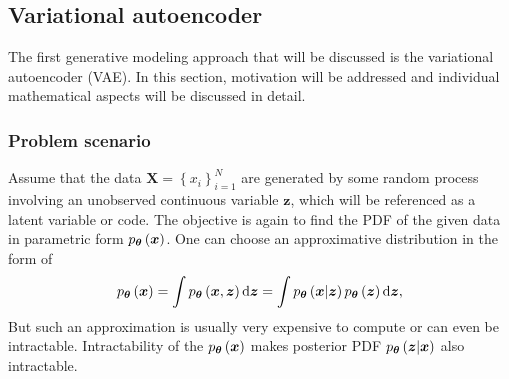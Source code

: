 \subsection{Variational autoencoder}
The first generative modeling approach that will be discussed is the variational autoencoder (VAE). In this section, motivation will be addressed and individual mathematical aspects will be discussed in detail. 
\subsubsection{Problem scenario}
Assume that the data $\boldsymbol{X}=\left\lbrace x_i \right\rbrace^N_{i=1}$ are generated by some random process involving an unobserved continuous variable $\boldsymbol{z}$, which will be referenced as a latent variable or code. The objective is again to find the PDF of the given data in parametric form $p_{\boldsymbol{\theta}}\left(\boldsymbol{x}\right)$. One can choose an approximative distribution in the form of
\begin{equation}\label{eq:VAE_approxform}
p_{\boldsymbol{\theta}}\left(\boldsymbol{x}\right) = \int p_{\boldsymbol{\theta}}\left(\boldsymbol{x},  \boldsymbol{z}\right)\mathrm{d}{\boldsymbol{z}} =\int p_{\boldsymbol{\theta}}\left(\boldsymbol{x}\vert \boldsymbol{z}\right)p_{\boldsymbol{\theta}}\left(\boldsymbol{z}\right)\mathrm{d}{\boldsymbol{z}},
\end{equation}
But such an approximation is usually very expensive to compute or can even be intractable. Intractability of the $p_{\boldsymbol{\theta}}\left(\boldsymbol{x}\right)$ makes posterior PDF $p_{\boldsymbol{\theta}}\left(\boldsymbol{z}\vert\boldsymbol{x}\right)$ also intractable.


